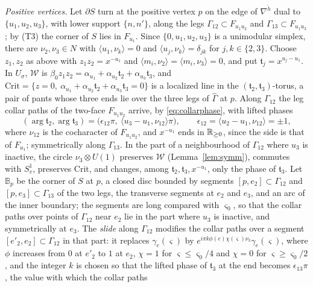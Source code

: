 \emph{Positive vertices.} Let $\partial S$ turn at the positive vertex $p$ on the edge of $\nabla^{\check h}$ dual to
$\{u_1,u_2,u_3\}$, with lower support $\{n,n'\}$, along the legs $\Gamma_{12}\subset F_{u_1u_2}$ and
$\Gamma_{13}\subset F_{u_1u_3}$; by (T3) the corner of $S$ lies in $F_{u_1}$. Since $\{0,u_1,u_2,u_3\}$ is a unimodular simplex,
there are $\nu_2,\nu_3\in N$ with $\langle u_1,\nu_k\rangle=0$ and $\langle u_j,\nu_k\rangle=\delta_{jk}$ for $j,k\in\{2,3\}$.
Choose $z_1,z_2$ as above with $z_1z_2=x^{-u_1}$ and $\langle m_i,\nu_2\rangle=\langle m_i,\nu_3\rangle=0$, and put
$\mathfrak t_j=x^{u_j-u_1}$. In $U_\sigma$, $\mathscr W$ is $\beta_0z_1z_2=\alpha_{u_1}+\alpha_{u_2}\mathfrak t_2+\alpha_{u_3}\mathfrak
t_3$, and $\mathrm{Crit}=\{z=0,\ \alpha_{u_1}+\alpha_{u_2}\mathfrak t_2+\alpha_{u_3}\mathfrak t_3=0\}$ is a localized line in the
$(\mathfrak t_2,\mathfrak t_3)$-torus, a pair of pants whose three ends lie over the three legs of $\widehat\Gamma$ at $p$. Along
$\Gamma_{12}$ the leg collar paths of the two-face $F_{u_1u_2}$ arrive, by \eqref{eq:collarphase}, with lifted phases
\[
(\arg\mathfrak t_2,\arg\mathfrak t_3)=\bigl(\epsilon_{12}\pi,\ \langle u_3-u_1,\nu_{12}\rangle\pi\bigr),\qquad
\epsilon_{12}=\langle u_2-u_1,\nu_{12}\rangle=\pm1,
\]
where $\nu_{12}$ is the cocharacter of $F_{u_1u_2}$, and $x^{-u_1}$ ends in $\mathbb R_{\ge0}$, since the side is that of $F_{u_1}$;
symmetrically along $\Gamma_{13}$. In the part of a neighbourhood of $\Gamma_{12}$ where $u_3$ is inactive, the circle
$\nu_3\otimes U(1)$ preserves $\mathscr W$ (Lemma~\ref{lem:symm}), commutes with $S^1_v$, preserves $\mathrm{Crit}$, and changes, among
$\mathfrak t_2,\mathfrak t_3,x^{-u_1}$, only the phase of $\mathfrak t_3$. Let $\mathbb B_p$ be the corner of $S$ at $p$, a closed
disc bounded by segments $[p,e_2]\subset\Gamma_{12}$ and $[p,e_3]\subset\Gamma_{13}$ of the two legs, the transverse segments at
$e_2$ and $e_3$, and an arc of the inner boundary; the segments are long compared with $\varsigma_0$, so that the collar paths over
points of $\Gamma_{12}$ near $e_2$ lie in the part where $u_3$ is inactive, and symmetrically at $e_3$. The \emph{slide} along
$\Gamma_{12}$ modifies the collar paths over a segment $[e'_2,e_2]\subset\Gamma_{12}$ in that part: it replaces
$\gamma_e(\varsigma)$ by $e^{i\pi k\phi(e)\chi(\varsigma)\nu_3}\gamma_e(\varsigma)$, where $\phi$ increases from $0$ at $e'_2$
to $1$ at $e_2$, $\chi=1$ for $\varsigma\le\varsigma_0/4$ and $\chi=0$ for $\varsigma\ge\varsigma_0/2$, and the integer $k$ is
chosen so that the lifted phase of $\mathfrak t_3$ at the end becomes $\epsilon_{13}\pi$, the value with which the collar paths
